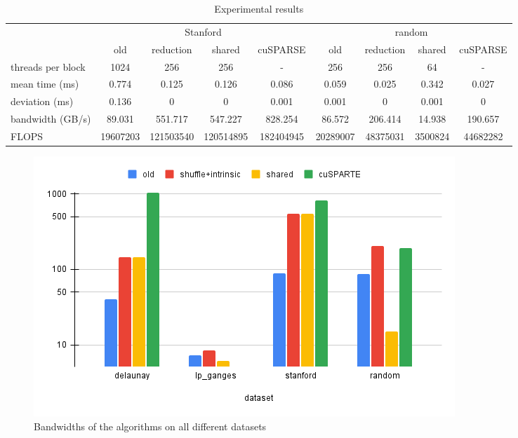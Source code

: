 \documentclass[conference]{IEEEtran}
\begin{document}
\begin{table}[ht!]
    \begin{subtable}{\columnwidth}
        \centering
        \begin{adjustbox}{width=\columnwidth}
            \begin{tabular}{l|cccc|cccc}
                \toprule
                & \multicolumn{4}{c}{Stanford} & \multicolumn{4}{c}{random} \\
                \cmidrule(lr){2-5} \cmidrule(lr){6-9}
                & old & reduction & shared & cuSPARSE & old & reduction & shared & cuSPARSE \\
                \midrule
                threads per block & 1024 & 256 & 256 & - & 256 & 256 & 64 & - \\
                mean time (ms) & 0.774 & 0.125 & 0.126 & 0.086 & 0.059 & 0.025 & 0.342 & 0.027 \\
                deviation (ms) & 0.136 & 0 & 0 & 0.001 & 0.001 & 0 & 0.001 & 0 \\
                bandwidth (GB/s) & 89.031 & 551.717 & 547.227 & 828.254 & 86.572 & 206.414 & 14.938 & 190.657 \\
                FLOPS & 19607203 & 121503540 & 120514895 & 182404945 & 20289007 & 48375031 & 3500824 & 44682282 \\
                \bottomrule
            \end{tabular}
        \end{adjustbox}
    \end{subtable}
    \caption{Experimental results}
    \label{tab:results}
\end{table}

\begin{figure}
    \centering
    \includegraphics[width=0.95\linewidth]{images/bandwidths.png}
    \caption{Bandwidths of the algorithms on all different datasets}
    \label{fig:bandwidths}
\end{figure}
\end{document}

